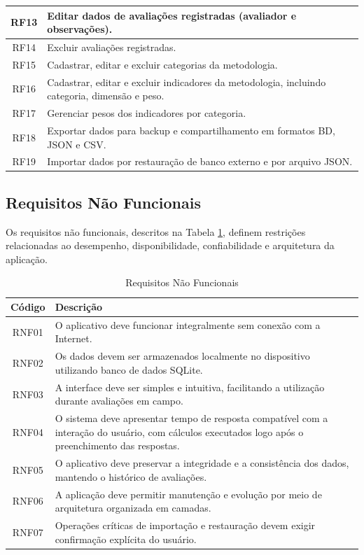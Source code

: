 \begin{table}[h]
\begin{tabular}{|c|p{10cm}|}
        \hline
        RF13 & Editar dados de avaliações registradas (avaliador e observações). \\
        \hline
        RF14 & Excluir avaliações registradas. \\
        \hline
        RF15 & Cadastrar, editar e excluir categorias da metodologia. \\
        \hline
        RF16 & Cadastrar, editar e excluir indicadores da metodologia, incluindo categoria, dimensão e peso. \\
        \hline
        RF17 & Gerenciar pesos dos indicadores por categoria. \\
        \hline
        RF18 & Exportar dados para backup e compartilhamento em formatos BD, JSON e CSV. \\
        \hline
        RF19 & Importar dados por restauração de banco externo e por arquivo JSON. \\
        \hline
    \end{tabular}
\end{table}

\subsection{Requisitos Não Funcionais}
\label{subsec:requisitos_nao_funcionais}

Os requisitos não funcionais, descritos na Tabela \ref{tab:requisitos_nao_funcionais}, definem restrições relacionadas ao desempenho, disponibilidade, confiabilidade e arquitetura da aplicação.

\begin{table}[h]
    \centering
    \caption{Requisitos Não Funcionais}
    \label{tab:requisitos_nao_funcionais}
    \begin{tabular}{|c|p{10cm}|}
        \hline
        \textbf{Código} & \textbf{Descrição} \\
        \hline
        RNF01 & O aplicativo deve funcionar integralmente sem conexão com a Internet. \\
        \hline
        RNF02 & Os dados devem ser armazenados localmente no dispositivo utilizando banco de dados SQLite. \\
        \hline
        RNF03 & A interface deve ser simples e intuitiva, facilitando a utilização durante avaliações em campo. \\
        \hline
        RNF04 & O sistema deve apresentar tempo de resposta compatível com a interação do usuário, com cálculos executados logo após o preenchimento das respostas. \\
        \hline
        RNF05 & O aplicativo deve preservar a integridade e a consistência dos dados, mantendo o histórico de avaliações. \\
        \hline
        RNF06 & A aplicação deve permitir manutenção e evolução por meio de arquitetura organizada em camadas. \\
        \hline
        RNF07 & Operações críticas de importação e restauração devem exigir confirmação explícita do usuário. \\
        \hline
    \end{tabular}
\end{table}

